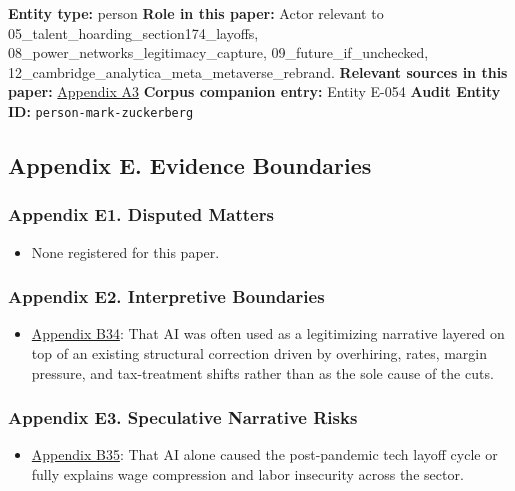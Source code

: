 \documentclass[
  american,
  11pt,
  letterpaper,
]{article}
\providecommand{\tightlist}{%
  \setlength{\itemsep}{0pt}\setlength{\parskip}{0pt}}
\begin{document}
\textbf{Entity type:} person \textbf{Role in this paper:} Actor relevant
to 05\_talent\_hoarding\_section174\_layoffs,
08\_power\_networks\_legitimacy\_capture, 09\_future\_if\_unchecked,
12\_cambridge\_analytica\_meta\_metaverse\_rebrand. \textbf{Relevant
sources in this paper:}
\hyperref[ch-05-appendix-a3-mark-zuckerberg-s-message-to-meta-employees]{Appendix
A3} \textbf{Corpus companion entry:} Entity E-054 \textbf{Audit Entity
ID:} \texttt{person-mark-zuckerberg}

\subsection{Appendix E. Evidence
Boundaries}\label{appendix-e.-evidence-boundaries-5}

\subsubsection{Appendix E1. Disputed
Matters}\label{ch-05-appendix-e1-disputed-matters}

\begin{itemize}
\tightlist
\item
  None registered for this paper.
\end{itemize}

\subsubsection{Appendix E2. Interpretive
Boundaries}\label{ch-05-appendix-e2-interpretive-boundaries}

\begin{itemize}
\tightlist
\item
  \hyperref[ch-05-appendix-b34-ai-was-often-used-as-a-legitimizing-narrative-layered-on-top-of-an-existing-struc]{Appendix
  B34}: That AI was often used as a legitimizing narrative layered on
  top of an existing structural correction driven by overhiring, rates,
  margin pressure, and tax-treatment shifts rather than as the sole
  cause of the cuts.
\end{itemize}

\subsubsection{Appendix E3. Speculative Narrative
Risks}\label{ch-05-appendix-e3-speculative-narrative-risks}

\begin{itemize}
\tightlist
\item
  \hyperref[ch-05-appendix-b35-ai-alone-caused-the-post-pandemic-tech-layoff-cycle-or-fully-explains-wage-compre]{Appendix
  B35}: That AI alone caused the post-pandemic tech layoff cycle or
  fully explains wage compression and labor insecurity across the
  sector.
\end{itemize}
\end{document}
